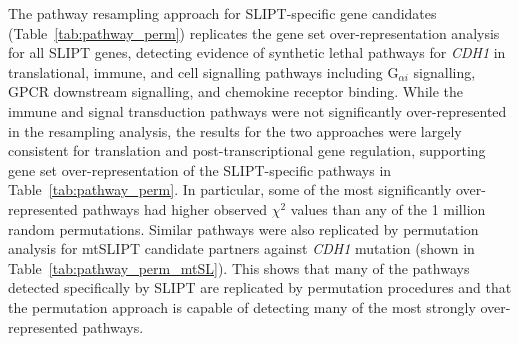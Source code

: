 The pathway resampling approach for \gls{SLIPT}-specific gene candidates (Table~\ref{tab:pathway_perm}) replicates the gene set over-represent\-ation analysis for all \gls{SLIPT} genes, detecting evidence of \gls{synthetic lethal} pathways for \textit{CDH1} in translational, immune, and cell signalling pathways including  G$_{\alpha i}$ signalling, \gls{GPCR} downstream signalling, and chemokine receptor binding. While the immune and signal transduction pathways were not significantly over-represented in the resampling analysis, the results for the two approaches were largely consistent for translation and post-transcriptional gene regulation, supporting gene set over-represent\-ation of the \gls{SLIPT}-specific pathways in Table~\ref{tab:pathway_perm}. In particular, some of the most significantly over-represented pathways had higher observed $\chi^2$ values than any of the 1 million random permutations. Similar pathways were also replicated by permutation analysis for mt\gls{SLIPT} candidate partners against \textit{CDH1} \gls{mutation} (shown in Table~\ref{tab:pathway_perm_mtSL}). This shows that many of the pathways detected specifically by \gls{SLIPT} are replicated by permutation procedures and that the permutation approach is capable of detecting many of the most strongly over-represented pathways. 


